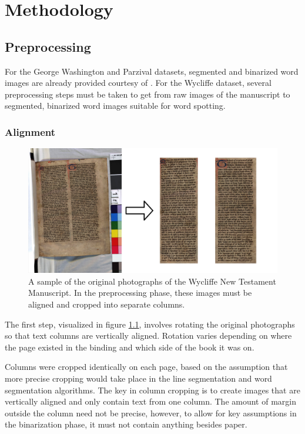 \documentclass[final]{ukthesis}
\begin{document}
%
%
%
\chapter{Methodology}


%
%
\section{Preprocessing}
For the George Washington and Parzival datasets, segmented and binarized word images are already provided courtesy of \cite{fischer2012lexicon}. For the Wycliffe dataset, several preprocessing steps must be taken to get from raw images of the manuscript to segmented, binarized word images suitable for word spotting. 

\subsection{Alignment}

\begin{figure}[t]
\begin{center}
\includegraphics[width=14cm]{rotate-crop}
\end{center}
\caption{A sample of the original photographs of the Wycliffe New Testament Manuscript. In the preprocessing phase, these images must be aligned and cropped into separate columns.}
\label{fig:rotate-crop}
\end{figure}
The first step, visualized in figure \ref{fig:rotate-crop}, involves rotating the original photographs so that text columns are vertically aligned. Rotation varies depending on where the page existed in the binding and which side of the book it was on.

Columns were cropped identically on each page, based on the assumption that more precise cropping would take place in the line segmentation and word segmentation algorithms. The key in column cropping is to create images that are vertically aligned and only contain text from one column. The amount of margin outside the column need not be precise, however, to allow for key assumptions in the binarization phase, it must not contain anything besides paper.
\end{document}
